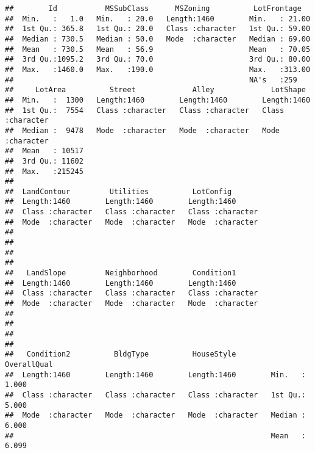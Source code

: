 \documentclass[]{article}
\begin{document}
\begin{verbatim}
##        Id           MSSubClass      MSZoning          LotFrontage    
##  Min.   :   1.0   Min.   : 20.0   Length:1460        Min.   : 21.00  
##  1st Qu.: 365.8   1st Qu.: 20.0   Class :character   1st Qu.: 59.00  
##  Median : 730.5   Median : 50.0   Mode  :character   Median : 69.00  
##  Mean   : 730.5   Mean   : 56.9                      Mean   : 70.05  
##  3rd Qu.:1095.2   3rd Qu.: 70.0                      3rd Qu.: 80.00  
##  Max.   :1460.0   Max.   :190.0                      Max.   :313.00  
##                                                      NA's   :259     
##     LotArea          Street             Alley             LotShape        
##  Min.   :  1300   Length:1460        Length:1460        Length:1460       
##  1st Qu.:  7554   Class :character   Class :character   Class :character  
##  Median :  9478   Mode  :character   Mode  :character   Mode  :character  
##  Mean   : 10517                                                           
##  3rd Qu.: 11602                                                           
##  Max.   :215245                                                           
##                                                                           
##  LandContour         Utilities          LotConfig        
##  Length:1460        Length:1460        Length:1460       
##  Class :character   Class :character   Class :character  
##  Mode  :character   Mode  :character   Mode  :character  
##                                                          
##                                                          
##                                                          
##                                                          
##   LandSlope         Neighborhood        Condition1       
##  Length:1460        Length:1460        Length:1460       
##  Class :character   Class :character   Class :character  
##  Mode  :character   Mode  :character   Mode  :character  
##                                                          
##                                                          
##                                                          
##                                                          
##   Condition2          BldgType          HouseStyle         OverallQual    
##  Length:1460        Length:1460        Length:1460        Min.   : 1.000  
##  Class :character   Class :character   Class :character   1st Qu.: 5.000  
##  Mode  :character   Mode  :character   Mode  :character   Median : 6.000  
##                                                           Mean   : 6.099  

\end{verbatim}
\end{document}
